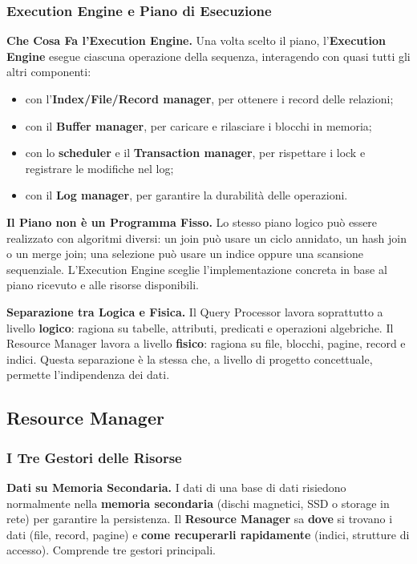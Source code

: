 \documentclass[12pt]{extarticle}
\begin{document}
\subsubsection{Execution Engine e Piano di Esecuzione}

\noindent \textbf{Che Cosa Fa l'Execution Engine.} Una volta scelto il piano, l'\textbf{Execution Engine} esegue ciascuna operazione della sequenza, interagendo con quasi tutti gli altri componenti:
\begin{itemize}
    \item con l'\textbf{Index/File/Record manager}, per ottenere i record delle relazioni;
    \item con il \textbf{Buffer manager}, per caricare e rilasciare i blocchi in memoria;
    \item con lo \textbf{scheduler} e il \textbf{Transaction manager}, per rispettare i lock e registrare le modifiche nel log;
    \item con il \textbf{Log manager}, per garantire la durabilità delle operazioni.
\end{itemize}

\medskip
\noindent \textbf{Il Piano non è un Programma Fisso.} Lo stesso piano logico può essere realizzato con algoritmi diversi: un join può usare un ciclo annidato, un hash join o un merge join; una selezione può usare un indice oppure una scansione sequenziale. L'Execution Engine sceglie l'implementazione concreta in base al piano ricevuto e alle risorse disponibili.

\medskip
\noindent \textbf{Separazione tra Logica e Fisica.} Il Query Processor lavora soprattutto a livello \textbf{logico}: ragiona su tabelle, attributi, predicati e operazioni algebriche. Il Resource Manager lavora a livello \textbf{fisico}: ragiona su file, blocchi, pagine, record e indici. Questa separazione è la stessa che, a livello di progetto concettuale, permette l'indipendenza dei dati.

\subsection{Resource Manager}
\subsubsection{I Tre Gestori delle Risorse}

\noindent \textbf{Dati su Memoria Secondaria.} I dati di una base di dati risiedono normalmente nella \textbf{memoria secondaria} (dischi magnetici, SSD o storage in rete) per garantire la persistenza. Il \textbf{Resource Manager} sa \textbf{dove} si trovano i dati (file, record, pagine) e \textbf{come recuperarli rapidamente} (indici, strutture di accesso). Comprende tre gestori principali.
\end{document}
